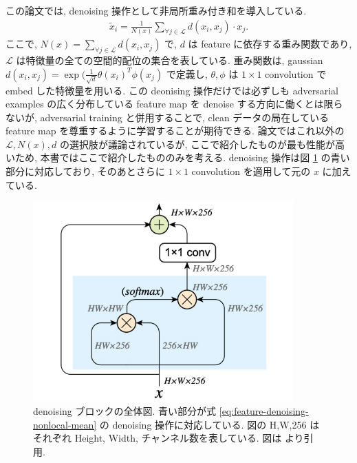 この論文では, denoising 操作として非局所重み付き和を導入している.
%
\begin{eqnarray}
\tilde{x}_i = \frac{1}{N(x)} \sum_{\forall j \in \mathcal{L}} d(x_i, x_j) \cdot x_j.
\label{eq:feature-denoising-nonlocal-mean}
\end{eqnarray}
%
ここで, $N(x) = \sum_{\forall j \in \mathcal{L}} d(x_i, x_j)$ で, $d$ は feature に依存する重み関数であり, $\mathcal{L}$ は特徴量の全ての空間的配位の集合を表している.
重み関数は, gaussian $d(x_i, x_j) = \exp (\frac{1}{\sqrt{d}} \theta (x_i)^T \phi (x_j)$ で定義し, $\theta, \phi$ は $1 \times 1$ convolution で embed した特徴量を用いる.
この deonising 操作だけでは必ずしも adversarial examples の広く分布している feature map を denoise する方向に働くとは限らないが, adversarial training と併用することで, clean データの局在している feature map を尊重するように学習することが期待できる.
論文ではこれ以外の $\mathcal{L}, N(x), d$ の選択肢が議論されているが, ここで紹介したものが最も性能が高いため, 本書ではここで紹介したもののみを考える. 
denoising 操作は図 \ref{fig:feature-denoising-denoising-block} の青い部分に対応しており, そのあとさらに $1 \times 1$ convolution を適用して元の $x$ に加えている.
%
\begin{figure}[htbp]
\begin{center}
\includegraphics[width=10.0cm]{figures/feature-denoising-denoising-block.pdf}
\end{center}
\caption{
denoising ブロックの全体図.
青い部分が式 \ref{eq:feature-denoising-nonlocal-mean} の denoising 操作に対応している.
図の H,W,256 はそれぞれ Height, Width, チャンネル数を表している.
図は \cite{xie2019feature} より引用.
}
\label{fig:feature-denoising-denoising-block}
\end{figure}
%

